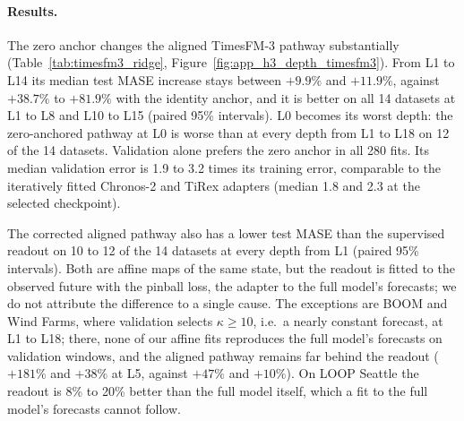 \paragraph{Results.} The zero anchor changes the aligned TimesFM-3 pathway substantially (Table~\ref{tab:timesfm3_ridge}, Figure~\ref{fig:app_h3_depth_timesfm3}). From L1 to L14 its median test MASE increase stays between $+9.9\%$ and $+11.9\%$, against $+38.7\%$ to $+81.9\%$ with the identity anchor, and it is better on all 14 datasets at L1 to L8 and L10 to L15 (paired 95\% intervals). L0 becomes its worst depth: the zero-anchored pathway at L0 is worse than at every depth from L1 to L18 on 12 of the 14 datasets. Validation alone prefers the zero anchor in all 280 fits. Its median validation error is 1.9 to 3.2 times its training error, comparable to the iteratively fitted Chronos-2 and TiRex adapters (median 1.8 and 2.3 at the selected checkpoint).

The corrected aligned pathway also has a lower test MASE than the supervised readout on 10 to 12 of the 14 datasets at every depth from L1 (paired 95\% intervals). Both are affine maps of the same state, but the readout is fitted to the observed future with the pinball loss, the adapter to the full model's forecasts; we do not attribute the difference to a single cause. The exceptions are BOOM and Wind Farms, where validation selects $\kappa\ge10$, i.e.\ a nearly constant forecast, at L1 to L18; there, none of our affine fits reproduces the full model's forecasts on validation windows, and the aligned pathway remains far behind the readout ($+181\%$ and $+38\%$ at L5, against $+47\%$ and $+10\%$). On LOOP Seattle the readout is 8\% to 20\% better than the full model itself, which a fit to the full model's forecasts cannot follow.


